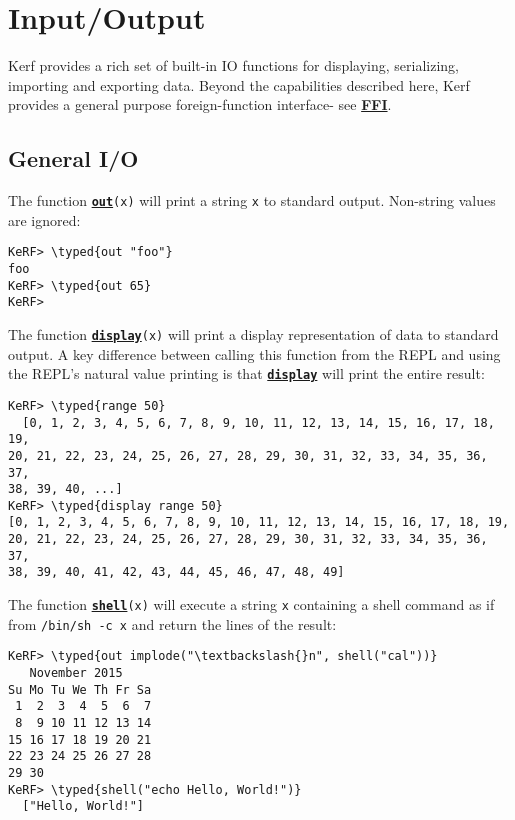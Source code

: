 \documentclass{article}
\newcommand{\typed}[1]{\textcolor{TealBlue}{#1}}
\newcommand{\primu}[2]{\hyperref[prim:#2]{\textbf{\texttt{#1}}}}
\newcommand{\prim}[1]{\primu{#1}{#1}}
\begin{document}
\pagebreak
\section {Input/Output}
Kerf provides a rich set of built-in IO functions for displaying, serializing, importing and exporting data. Beyond the capabilities described here, Kerf provides a general purpose foreign-function interface- see \hyperref[sec:ffi]{\textbf{FFI}}.

\subsection{General I/O}\label{sec:genio}

The function \prim{out}\texttt{(x)} will print a string \texttt{x} to standard output. Non-string values are ignored:
\begin{Verbatim}
KeRF> \typed{out "foo"}
foo
KeRF> \typed{out 65}
KeRF>
\end{Verbatim}

The function \prim{display}\texttt{(x)} will print a display representation of data to standard output. A key difference between calling this function from the REPL and using the REPL's natural value printing is that \prim{display} will print the entire result:

\begin{Verbatim}
KeRF> \typed{range 50}
  [0, 1, 2, 3, 4, 5, 6, 7, 8, 9, 10, 11, 12, 13, 14, 15, 16, 17, 18, 19,
20, 21, 22, 23, 24, 25, 26, 27, 28, 29, 30, 31, 32, 33, 34, 35, 36, 37,
38, 39, 40, ...]
KeRF> \typed{display range 50}
[0, 1, 2, 3, 4, 5, 6, 7, 8, 9, 10, 11, 12, 13, 14, 15, 16, 17, 18, 19,
20, 21, 22, 23, 24, 25, 26, 27, 28, 29, 30, 31, 32, 33, 34, 35, 36, 37,
38, 39, 40, 41, 42, 43, 44, 45, 46, 47, 48, 49]
\end{Verbatim}

The function \prim{shell}\texttt{(x)} will execute a string \texttt{x} containing a shell command as if from \texttt{/bin/sh -c x} and return the lines of the result:

\begin{Verbatim}
KeRF> \typed{out implode("\textbackslash{}n", shell("cal"))}
   November 2015
Su Mo Tu We Th Fr Sa
 1  2  3  4  5  6  7
 8  9 10 11 12 13 14
15 16 17 18 19 20 21
22 23 24 25 26 27 28
29 30
KeRF> \typed{shell("echo Hello, World!")}
  ["Hello, World!"]
\end{Verbatim}

\pagebreak
\end{document}
